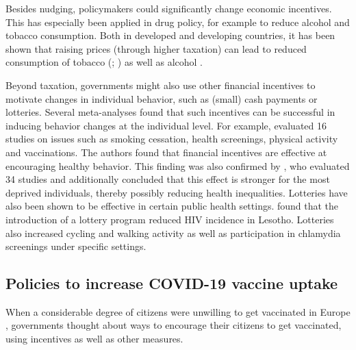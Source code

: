 \documentclass{scrbook}
\begin{document}
Besides nudging, policymakers could significantly change economic
incentives. This has especially been applied in drug policy, for example
to reduce alcohol and tobacco consumption. Both in developed and
developing countries, it has been shown that raising prices (through
higher taxation) can lead to reduced consumption of tobacco
(\cite{yeh_effects_2017}; \cite{immurana_effects_2021}) as well as
alcohol \parencite{daley_impact_2012}.

Beyond taxation, governments might also use other financial incentives
to motivate changes in individual behavior, such as (small) cash
payments or lotteries. Several meta-analyses found that such incentives
can be successful in inducing behavior changes at the individual level.
For example, \textcite{giles_effectiveness_2014} evaluated 16 studies on
issues such as smoking cessation, health screenings, physical activity
and vaccinations. The authors found that financial incentives are
effective at encouraging healthy behavior. This finding was also
confirmed by \textcite{mantzari_personal_2015}, who evaluated 34 studies
and additionally concluded that this effect is stronger for the most
deprived individuals, thereby possibly reducing health inequalities.
Lotteries have also been shown to be effective in certain public health
settings. \textcite{bjorkman_nyqvist_incentivizing_2018} found that the
introduction of a lottery program reduced HIV incidence in Lesotho.
Lotteries also increased cycling \parencite{ciccone_using_2021} and
walking activity \parencite{patel_randomized_2018} as well as
participation in chlamydia screenings \parencite{niza_vouchers_2014}
under specific settings.

\subsection*{Policies to increase COVID-19 vaccine uptake}

When a considerable degree of citizens were unwilling to get vaccinated
in Europe \parencite{steinert_covid-19_2022}, governments thought about
ways to encourage their citizens to get vaccinated, using incentives as
well as other measures.
\end{document}
